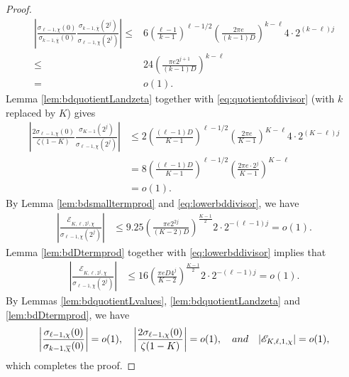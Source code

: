 \documentclass[10pt,a4paper]{amsart}
\begin{document}
\begin{proof}
\begin{align}
    \left|\frac{\sigma_{\ell-1,\chi}(0)}{\sigma_{k-1,\overline{\chi}}(0)}\frac{\sigma_{k-1,\overline{\chi}}(2^j)}{\sigma_{\ell-1,\chi}(2^j)}\right|
    \leq& 6\left(\frac{\ell-1}{k-1}\right)^{\ell-1/2}\left(\frac{2\pi e}{(k-1)D}\right)^{k-\ell}4\cdot2^{(k-\ell)j}  \nonumber\\
    \leq&24\left(\frac{\pi e 2^{j+1}}{(k-1)D}\right)^{k-\ell}\label{eq:bdagain}\\=&o(1).  \nonumber
\end{align}
Lemma \ref{lem:bdquotientLandzeta} together with \eqref{eq:quotientofdivisor} (with $k$ replaced by $K$) gives
\begin{align}
    \left|\frac{2\sigma_{\ell-1,\chi}(0)}{\zeta(1-K) }\frac{\sigma_{K-1}(2^j)}{\sigma_{\ell-1,\chi}(2^j)}\right|&\leq 2\left(\frac{(\ell-1)D}{K-1}\right)^{\ell-1/2}\left(\frac{2\pi e}{K-1}\right)^{K-\ell}4\cdot 2^{(K-\ell)j}  \nonumber\\&=8\left(\frac{(\ell-1)D}{K-1}\right)^{\ell-1/2}\left(\frac{2\pi e\cdot 2^j}{K-1}\right)^{K-\ell}\label{eq:bdquotienttwistandzeta}
    \\&=o(1).  \nonumber
\end{align}
By Lemma \ref{lem:bdsmalltermprod} and \eqref{eq:lowerbddivisor}, we have 
\begin{align*}
    \left|\frac{\mathcal{E}_{K,\ell,2^j,\chi}}{\sigma_{\ell-1,\chi}(2^j)}\right|&\leq 9.25\left(\frac{\pi e2^{2j}}{(K-2)D}\right)^{\frac{K-1}{2}}2\cdot 2^{-(\ell-1)j}=o(1).
\end{align*}
Lemma \ref{lem:bdDtermprod} together with \eqref{eq:lowerbddivisor} implies that
\begin{align*}
  \left|  \frac{\mathscr{E}_{K,\ell,2^j,\chi}}{\sigma_{\ell-1,\chi}(2^j)}\right|&\leq16\left(\frac{\pi eD4^j}{K-2}\right)^{\frac{K-1}{2}}2\cdot2^{-(\ell-1)j}=o(1).
\end{align*}
By Lemmas \ref{lem:bdquotientLvalues}, \ref{lem:bdquotientLandzeta} and \ref{lem:bdDtermprod}, we have  
\begin{align*}
    \left|\frac{\sigma_{\ell-1,\chi}(0)}{\sigma_{k-1,\overline{\chi}}(0)}\right|=o(1),\quad\left|\frac{2\sigma_{\ell-1,\chi}(0)}{\zeta(1-K)}\right|=o(1),\quad{\rm and}\quad|\mathscr{E}_{K,\ell,1,\chi}|=o(1),
\end{align*}
which completes the proof.
\end{proof}
\end{document}
